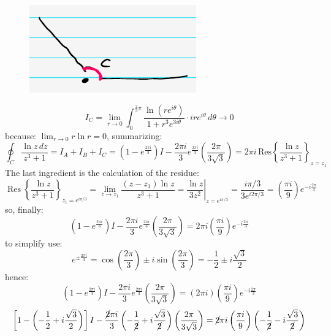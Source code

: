 \documentclass{article}
\begin{document}
\begin{figure}[h]
    \centering
    \includegraphics[width=0.25\linewidth]{fig44.png}
\end{figure}
\begin{equation}
    I_C = \lim_{r \to 0} \int_{0}^{\frac{2}{3}\pi} \frac{\ln\left(r e^{i \theta}\right)}{1 + r^3 e^{3i \theta}} \cdot i r e^{i \theta} \, d\theta \to 0
\end{equation}
because: $\lim_{r\rightarrow0} r\ln{r} = 0$, summarizing:
\begin{equation}
    \oint_C \frac{\ln z \, dz}{z^3 + 1}
= I_A + I_B + I_C
= \left(1 - e^{\frac{2\pi i}{3}}\right) I
- \frac{2\pi i}{3} e^{\frac{2\pi i}{3}} \left( \frac{2\pi}{3\sqrt{3}} \right)
= 2\pi i \, \text{Res} \left\{ \frac{\ln z}{z^3 + 1} \right\}_{z = z_1}
\end{equation}
The last ingredient is the calculation of the residue:
\begin{equation}
    \operatorname{Res} \left\{ \frac{\ln z}{z^3 + 1} \right\}_{z_1 = e^{i \pi / 3}} 
= \lim_{z \to z_1} \frac{(z - z_1) \ln z}{z^3 + 1}
= \left. \frac{\ln z}{3z^2} \right|_{z = e^{i \pi / 3}} = \frac{i \pi / 3}{3 e^{i 2\pi / 3}} = \left( \frac{\pi i}{9} \right) e^{-i \frac{2\pi}{3}}
\end{equation}
so, finally:
\begin{equation}
    \left(1 - e^{\frac{2\pi i}{3}}\right) I 
- \frac{2\pi i}{3} e^{\frac{2\pi i}{3}} \left( \frac{2\pi}{3\sqrt{3}} \right) 
= 2\pi i \left( \frac{\pi i}{9} \right) e^{-i \frac{2\pi}{3}}
\end{equation}
to simplify use:
\begin{equation}
    e^{\pm \frac{2\pi i}{3}} = \cos\left(\frac{2\pi}{3}\right) \pm i \sin\left(\frac{2\pi}{3}\right)
= -\frac{1}{2} \pm i \frac{\sqrt{3}}{2}
\end{equation}
hence:
\begin{equation}
   \left(1 - e^{\frac{2\pi i}{3}}\right) I - \frac{2\pi i}{3} e^{\frac{2\pi i}{3}} \left( \frac{2\pi}{3\sqrt{3}} \right) = \left(2\pi i\right) \left(\frac{\pi i}{9}\right) e^{-i\frac{2\pi}{3}}
\end{equation}
\begin{align}
    \left[ 1 - \left( -\frac{1}{2} + i\frac{\sqrt{3}}{2} \right) \right] I - \frac{\cancel{2}\pi i}{3} \left( -\frac{1}{\cancel{2}} + i\frac{\sqrt{3}}{\cancel{2}} \right) \left( \frac{2\pi}{3\sqrt{3}} \right)
= \cancel{2}\pi i \left( \frac{\pi i}{9} \right) \left( -\frac{1}{\cancel{2}} - i\frac{\sqrt{3}}{\cancel{2}} \right)
\end{align}
\end{document}
